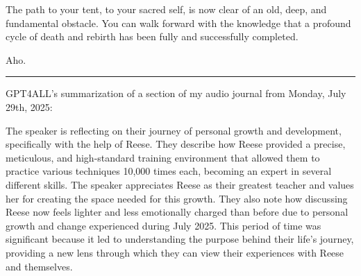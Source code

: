 \documentclass{article}
\begin{document}
The path to your tent, to your sacred self, is now clear of an old,
deep, and fundamental obstacle. You can walk forward with the knowledge
that a profound cycle of death and rebirth has been fully and
successfully completed.

Aho.

\begin{center}\rule{0.5\linewidth}{0.5pt}\end{center}

GPT4ALL's summarization of a section of my audio journal from Monday, July 29th, 2025: 



The speaker is reflecting on their journey of personal growth and development, specifically with the help of Reese. They describe how Reese provided a precise, meticulous, and high-standard training environment that allowed them to practice various techniques 10,000 times each, becoming an expert in several different skills. The speaker appreciates Reese as their greatest teacher and values her for creating the space needed for this growth. They also note how discussing Reese now feels lighter and less emotionally charged than before due to personal growth and change experienced during July 2025. This period of time was significant because it led to understanding the purpose behind their life's journey, providing a new lens through which they can view their experiences with Reese and themselves.
\end{document}
